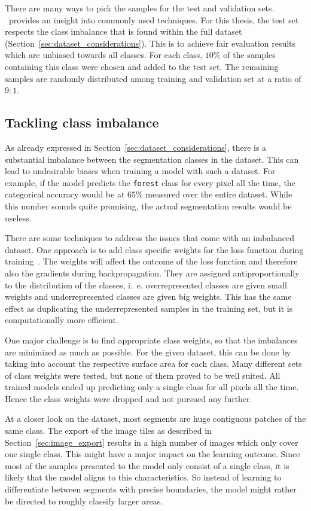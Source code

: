There are many ways to pick the samples for the test and validation sets. \cite{val_split18}~provides an insight into commonly used techniques. For this thesis, the test set respects the class imbalance that is found within the full dataset (Section~\ref{sec:dataset_considerations}). This is to achieve fair evaluation results which are unbiased towards all classes. For each class, $10\%$ of the samples containing this class were chosen and added to the test set. The remaining samples are randomly distributed among training and validation set at a ratio of $9:1$.

\subsection{Tackling class imbalance}
\label{sec:class_imbalance}
As already expressed in Section~\ref{sec:dataset_considerations}, there is a substantial imbalance between the segmentation classes in the dataset. This can lead to undesirable biases when training a model with such a dataset. For example, if the model predicts the \texttt{forest} class for every pixel all the time, the categorical accuracy would be at $65\%$ measured over the entire dataset. While this number sounds quite promising, the actual segmentation results would be useless.

There are some techniques to address the issues that come with an imbalanced dataset. One approach is to add class specific weights for the loss function during training~\cite{class_imbalance19}. The weights will affect the outcome of the loss function and therefore also the gradients during backpropagation. They are assigned antiproportionally to the distribution of the classes, i.~e. overrepresented classes are given small weights and underrepresented classes are given big weights. This has the same effect as duplicating the underrepresented samples in the training set, but it is computationally more efficient.

One major challenge is to find appropriate class weights, so that the imbalances are minimized as much as possible. For the given dataset, this can be done by taking into account the respective surface area for each class. Many different sets of class weights were tested, but none of them proved to be well suited. All trained models ended up predicting only a single class for all pixels all the time. Hence the class weights were dropped and not pursued any further.

At a closer look on the dataset, most segments are huge contiguous patches of the same class. The export of the image tiles as described in Section~\ref{sec:image_export} results in a high number of images which only cover one single class. This might have a major impact on the learning outcome. Since most of the samples presented to the model only consist of a single class, it is likely that the model aligns to this characteristics. So instead of learning to differentiate between segments with precise boundaries, the model might rather be directed to roughly classify larger areas.

